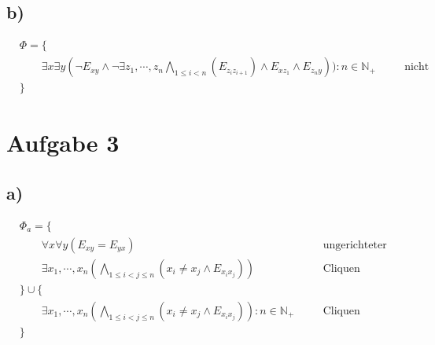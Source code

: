 \documentclass[11pt, a4paper]{article}
\newcommand{\n}{\wedge}
\begin{document}
\subsection*{b)}
\[\begin{aligned}
    &\Phi = \{ \\
        &\qquad \exists x \exists y (\neg E_{xy} \n \neg \exists z_1, \cdots, z_n \bigwedge_{1 \leq i < n} (E_{z_i z_{i+1}}) \n E_{x z_1} \n E_{z_n y})): n \in \mathbb{N}_+ &&\quad \text{nicht zusammenhängend} \\
    &\}
\end{aligned}\]


\section*{Aufgabe 3}
\subsection*{a)}
\[\begin{aligned}
    &\Phi_a = \{ \\
        &\qquad \forall x \forall y (E_{xy} = E_{yx}) &&\quad \text{ungerichteter Graph} \\
        &\qquad \exists x_1, \cdots, x_n (\bigwedge_{1 \leq i < j \leq n} (x_i \neq x_j \n E_{x_i x_j})) &&\quad \text{Cliquen} \\
    &\} \cup \{ \\
        &\qquad \exists x_1, \cdots, x_n (\bigwedge_{1 \leq i < j \leq n} (x_i \neq x_j \n E_{x_i x_j})): n \in \mathbb{N}_+ &&\quad \text{Cliquen} \\
    &\}
\end{aligned}\]
\end{document}
